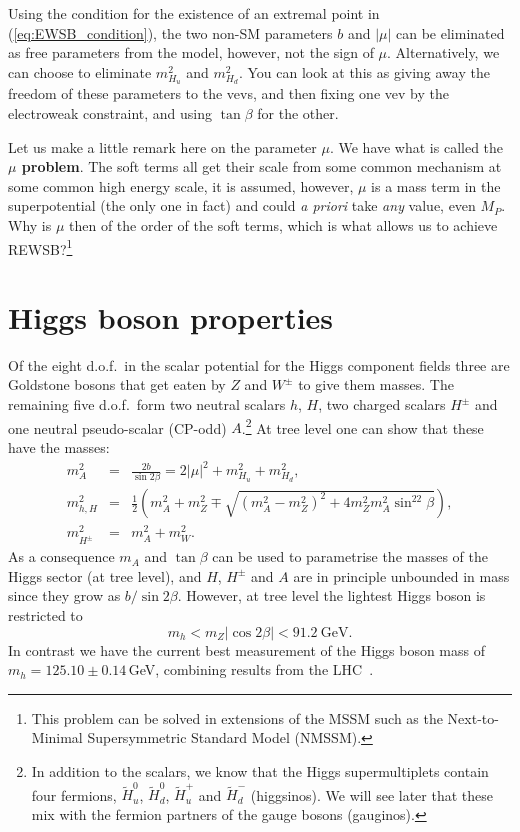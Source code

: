 \documentclass[notes.tex]{subfiles}
\begin{document}
Using the condition for the existence of an extremal point in (\ref{eq:EWSB_condition}), the two non-SM parameters $b$ and $|\mu|$ can be eliminated as free parameters from the model, however, not the sign of $\mu$. Alternatively, we can choose to eliminate $m_{H_u}^2$ and $m_{H_d}^2$. You can look at this as giving away the freedom of these parameters to the vevs, and then fixing one vev by the electroweak constraint, and using $\tan\beta$ for the other.

Let us make a little remark here on the parameter $\mu$. We have what is called the {\bf $\mu$ problem}. The soft terms all get their scale from some common mechanism at some common high energy scale, it is assumed, however, $\mu$ is a mass term in the superpotential (the only one in fact) and could {\it a priori} take {\it any} value, even $M_P$. Why is $\mu$ then of the order of the soft terms, which is what allows us to achieve REWSB?\footnote{This problem can be solved in extensions of the MSSM such as the Next-to-Minimal Supersymmetric Standard Model (NMSSM).}


\section{Higgs boson properties}
Of the eight d.o.f.\ in the scalar potential for the Higgs component fields three are Goldstone bosons that get eaten by $Z$ and $W^\pm$ to give them masses. The remaining five d.o.f.\ form two neutral scalars $h$, $H$, two charged scalars $H^\pm$ and one neutral pseudo-scalar (CP-odd) $A$.\footnote{In addition to the scalars, we know that the Higgs supermultiplets contain four fermions, $\tilde{H}^0_u$, $\tilde{H}^0_d$, $\tilde{H}^+_u$ and $\tilde{H}^-_d$ (higgsinos). We will see later that these mix with the fermion partners of the gauge bosons (gauginos).} At tree level one can show that these have the masses:
\begin{eqnarray}
m_A^2 &=& \frac{2b}{\sin2\beta} = 2|\mu|^2 + m_{H_u}^2 + m_{H_d}^2,\\
m_{h, H}^2 &=& \frac{1}{2}\left(m_A^2 + m_Z^2 \mp \sqrt{(m_A^2- m_Z^2)^2 + 4m_Z^2m_A^2\sin^22\beta}\right),\\
m_{H^\pm}^2 &=& m_A^2 + m_W^2.
\end{eqnarray}
As a consequence $m_A$ and $\tan\beta$ can be used to parametrise the masses of the Higgs sector (at tree level), and
$H$, $H^\pm$ and $A$ are in principle unbounded in mass since they grow as $b/\sin2\beta$. However, at tree level the lightest Higgs boson is restricted to
\begin{equation}
m_h < m_Z|\cos 2\beta| < 91.2~\text{GeV}.
\end{equation}
In contrast we have the current best measurement of the Higgs boson mass of $m_h=125.10\pm 0.14$\,GeV, combining results from the LHC~\cite{ParticleDataGroup:2020ssz}.
\end{document}
